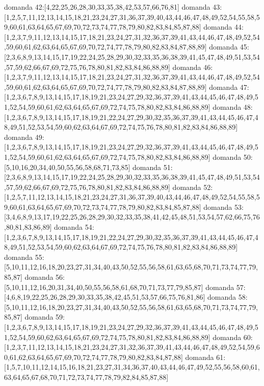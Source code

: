 domanda 42:[4,22,25,26,28,30,33,35,38,42,53,57,66,76,81]
domanda 43:[1,2,5,7,11,12,13,14,15,18,21,23,24,27,31,36,37,39,40,43,44,46,47,48,49,52,54,55,58,59,60,61,63,64,65,67,69,70,72,73,74,77,78,79,80,82,83,84,85,87,88]
domanda 44:[1,2,3,7,9,11,12,13,14,15,17,18,21,23,24,27,31,32,36,37,39,41,43,44,46,47,48,49,52,54,59,60,61,62,63,64,65,67,69,70,72,74,77,78,79,80,82,83,84,87,88,89]
domanda 45:[2,3,6,8,9,13,14,15,17,19,22,24,25,28,29,30,32,33,35,36,38,39,41,45,47,48,49,51,53,54,57,59,62,66,67,69,72,75,76,78,80,81,82,83,84,86,88,89]
domanda 46:[1,2,3,7,9,11,12,13,14,15,17,18,21,23,24,27,31,32,36,37,39,41,43,44,46,47,48,49,52,54,59,60,61,62,63,64,65,67,69,70,72,74,77,78,79,80,82,83,84,87,88,89]
domanda 47:[1,2,3,6,7,8,9,13,14,15,17,18,19,21,23,24,27,29,32,36,37,39,41,43,44,45,46,47,48,49,51,52,54,59,60,61,62,63,64,65,67,69,72,74,75,78,80,82,83,84,86,88,89]
domanda 48:[1,2,3,6,7,8,9,13,14,15,17,18,19,21,22,24,27,29,30,32,35,36,37,39,41,43,44,45,46,47,48,49,51,52,53,54,59,60,62,63,64,67,69,72,74,75,76,78,80,81,82,83,84,86,88,89]
domanda 49:[1,2,3,6,7,8,9,13,14,15,17,18,19,21,23,24,27,29,32,36,37,39,41,43,44,45,46,47,48,49,51,52,54,59,60,61,62,63,64,65,67,69,72,74,75,78,80,82,83,84,86,88,89]
domanda 50:[5,10,16,20,34,40,50,55,56,58,68,71,73,85]
domanda 51:[2,3,6,8,9,13,14,15,17,19,22,24,25,28,29,30,32,33,35,36,38,39,41,45,47,48,49,51,53,54,57,59,62,66,67,69,72,75,76,78,80,81,82,83,84,86,88,89]
domanda 52:[1,2,5,7,11,12,13,14,15,18,21,23,24,27,31,36,37,39,40,43,44,46,47,48,49,52,54,55,58,59,60,61,63,64,65,67,69,70,72,73,74,77,78,79,80,82,83,84,85,87,88]
domanda 53:[3,4,6,8,9,13,17,19,22,25,26,28,29,30,32,33,35,38,41,42,45,48,51,53,54,57,62,66,75,76,80,81,83,86,89]
domanda 54:[1,2,3,6,7,8,9,13,14,15,17,18,19,21,22,24,27,29,30,32,35,36,37,39,41,43,44,45,46,47,48,49,51,52,53,54,59,60,62,63,64,67,69,72,74,75,76,78,80,81,82,83,84,86,88,89]
domanda 55:[5,10,11,12,16,18,20,23,27,31,34,40,43,50,52,55,56,58,61,63,65,68,70,71,73,74,77,79,85,87]
domanda 56:[5,10,11,12,16,20,31,34,40,50,55,56,58,61,68,70,71,73,77,79,85,87]
domanda 57:[4,6,8,19,22,25,26,28,29,30,33,35,38,42,45,51,53,57,66,75,76,81,86]
domanda 58:[5,10,11,12,16,18,20,23,27,31,34,40,43,50,52,55,56,58,61,63,65,68,70,71,73,74,77,79,85,87]
domanda 59:[1,2,3,6,7,8,9,13,14,15,17,18,19,21,23,24,27,29,32,36,37,39,41,43,44,45,46,47,48,49,51,52,54,59,60,62,63,64,65,67,69,72,74,75,78,80,81,82,83,84,86,88,89]
domanda 60:[1,2,3,7,11,12,13,14,15,18,21,23,24,27,31,32,36,37,39,41,43,44,46,47,48,49,52,54,59,60,61,62,63,64,65,67,69,70,72,74,77,78,79,80,82,83,84,87,88]
domanda 61:[1,5,7,10,11,12,14,15,16,18,21,23,27,31,34,36,37,40,43,44,46,47,49,52,55,56,58,60,61,63,64,65,67,68,70,71,72,73,74,77,78,79,82,84,85,87,88]
